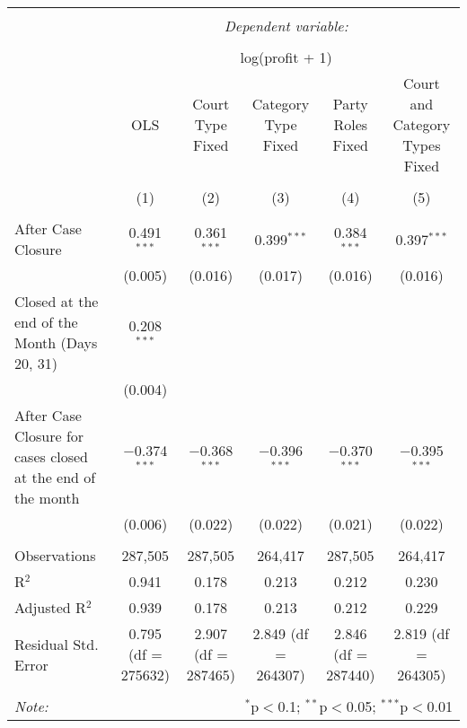 \documentclass[12pt]{article}
\begin{document}
\newpage

\begin{landscape}

\begin{table}[!htbp] \centering 
  \caption{} 
  \label{fig:table1} 
\tiny 
\begin{tabular}{@{\extracolsep{2pt}}lccccc} 
\\[-1.8ex]\hline 
\hline \\[-1.8ex] 
 & \multicolumn{5}{c}{\textit{Dependent variable:}} \\ 
\cline{2-6} 
\\[-1.8ex] & \multicolumn{5}{c}{log(profit + 1)} \\ 
 & OLS & Court Type Fixed & Category Type Fixed & Party Roles Fixed & Court and Category Types Fixed \\ 
\\[-1.8ex] & (1) & (2) & (3) & (4) & (5)\\ 
\hline \\[-1.8ex] 
 After Case Closure & 0.491$^{***}$ & 0.361$^{***}$ & 0.399$^{***}$ & 0.384$^{***}$ & 0.397$^{***}$ \\ 
  & (0.005) & (0.016) & (0.017) & (0.016) & (0.016) \\ 
  Closed at the end of the Month (Days 20, 31) & 0.208$^{***}$ &  &  &  &  \\ 
  & (0.004) &  &  &  &  \\ 
  After Case Closure for cases closed at the end of the month & $-$0.374$^{***}$ & $-$0.368$^{***}$ & $-$0.396$^{***}$ & $-$0.370$^{***}$ & $-$0.395$^{***}$ \\ 
  & (0.006) & (0.022) & (0.022) & (0.021) & (0.022) \\ 
 \hline \\[-1.8ex] 
Observations & 287,505 & 287,505 & 264,417 & 287,505 & 264,417 \\ 
R$^{2}$ & 0.941 & 0.178 & 0.213 & 0.212 & 0.230 \\ 
Adjusted R$^{2}$ & 0.939 & 0.178 & 0.213 & 0.212 & 0.229 \\ 
Residual Std. Error & 0.795 (df = 275632) & 2.907 (df = 287465) & 2.849 (df = 264307) & 2.846 (df = 287440) & 2.819 (df = 264305) \\ 
\hline 
\hline \\[-1.8ex] 
\textit{Note:}  & \multicolumn{5}{r}{$^{*}$p$<$0.1; $^{**}$p$<$0.05; $^{***}$p$<$0.01} \\ 
\end{tabular} 
  \caption{} 
  \label{fig:table2} 
\tiny 
\begin{tabular}{@{\extracolsep{2pt}}lccc} 

\end{tabular}
\end{table}
\end{landscape}
\end{document}
